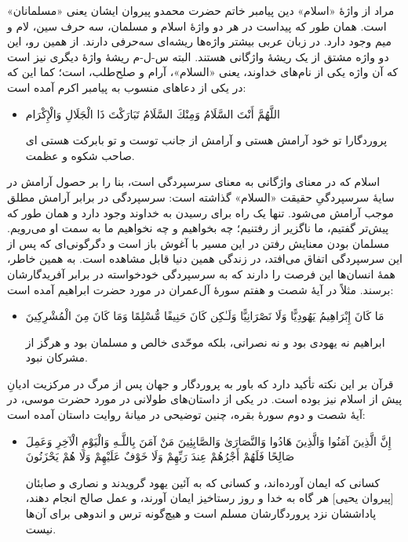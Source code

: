 مراد از واژهٔ «اسلام» دین پیامبر خاتم حضرت محمد{}و پیروان ایشان یعنی «مسلمانان» است. همان طور که پیداست در هر دو واژهٔ‌ اسلام و مسلمان، سه حرف سین، لام و میم وجود دارد. در زبان عربی بیشتر واژه‌ها ریشه‌ای سه‌حرفی دارند. از همین رو، این دو واژه مشتق از یک ریشهٔ واژگانی هستند. البته س-ل-م ریشهٔ واژهٔ دیگری نیز است که آن واژه یکی از نام‌های خداوند، یعنی «السلام»،  آرام و صلح‌طلب، است؛ کما این که در یکی از دعاهای منسوب به پیامبر اکرم{} آمده است:
\begin{itemize}
	\item[]
	{
		اللَّهُمَّ أَنْتَ السَّلَامُ وَمِنْكَ السَّلَامُ تَبَارَكْتَ ذَا الْجَلَالِ وَالْإِكْرَام}
	
	{ پروردگارا تو خود آرامش هستی و آرامش از جانب توست و تو بابرکت هستی ای صاحب شکوه و عظمت.}
\end{itemize}

اسلام که در معنای واژگانی به معنای سرسپردگی است، بنا را بر حصول آرامش در سایهٔ سرسپردگیِ حقیقت «السلام» گذاشته است: سرسپردگی در برابر آرامش مطلق موجب آرامش می‌شود. تنها یک راه برای رسیدن به خداوند وجود دارد و همان طور که پیش‌تر گفتیم، ما ناگزیر از رفتنیم؛ چه بخواهیم و چه نخواهیم ما به سمت او می‌رویم. مسلمان بودن معنایش رفتن در این مسیر با آغوش باز است و دگرگونی‌ای که پس از این سرسپردگی اتفاق می‌افتد، در زندگی همین دنیا قابل مشاهده است. به همین خاطر، همهٔ انسان‌ها این فرصت را دارند که به سرسپردگی خودخواسته در برابر آفریدگارشان برسند. مثلاً در آیهٔ شصت و هفتم سورهٔ آل‌عمران در مورد حضرت ابراهیم{} آمده است:
\begin{itemize}
	\item[]
	{
		مَا كَانَ إِبْرَاهِيمُ يَهُودِيًّا وَلَا نَصْرَانِيًّا وَلَـٰكِن كَانَ حَنِيفًا مُّسْلِمًا وَمَا كَانَ مِنَ الْمُشْرِكِينَ}
	
	{ ابراهیم نه یهودی بود و نه نصرانی، بلکه موحّدی خالص و مسلمان بود و هرگز از مشرکان نبود.}
\end{itemize}

قرآن بر این نکته تأکید دارد که باور به پروردگار و جهان پس از مرگ در مرکزیت ادیانِ پیش از اسلام نیز بوده است. در یکی از داستان‌های طولانی در مورد حضرت موسی{}، در آیهٔ شصت و دوم سورهٔ بقره، چنین توضیحی در میانهٔ روایت داستان آمده است:


\begin{itemize}
	\item[]
	{
		إِنَّ الَّذِينَ آمَنُوا وَالَّذِينَ هَادُوا وَالنَّصَارَىٰ وَالصَّابِئِينَ مَنْ آمَنَ بِاللَّـهِ وَالْيَوْمِ الْآخِرِ وَعَمِلَ صَالِحًا فَلَهُمْ أَجْرُهُمْ عِندَ رَبِّهِمْ وَلَا خَوْفٌ عَلَيْهِمْ وَلَا هُمْ يَحْزَنُونَ}
	
	{
		کسانی که ایمان آورده‌اند، و کسانی که به آئین یهود گرویدند و نصاری و صابئان [پیروان یحیی‌] هر گاه به خدا و روز رستاخیز ایمان آورند، و عمل صالح انجام دهند، پاداششان نزد پروردگارشان مسلم است و هیچ‌گونه ترس و اندوهی برای ‌آن‌ها نیست.}
\end{itemize}


